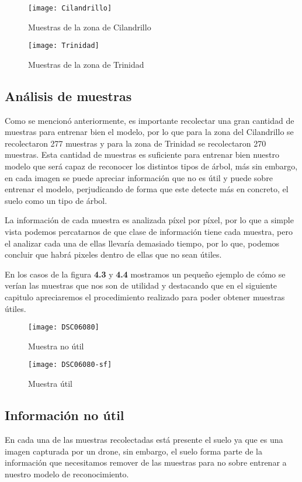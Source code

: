 \begin{figure}
 \centering
\texttt{[image: Cilandrillo]}
\caption{Muestras de la zona de Cilandrillo}
\end{figure}

\begin{figure}
 \centering
\texttt{[image: Trinidad]}
\caption{Muestras de la zona de Trinidad}
\end{figure}

\subsection{Análisis de muestras}
Como se mencionó anteriormente, es importante recolectar una gran cantidad de muestras para entrenar bien el modelo, por lo que para la zona del Cilandrillo se recolectaron 277 muestras y para la zona de Trinidad se recolectaron 270 muestras. Esta cantidad de muestras es suficiente para entrenar bien nuestro modelo que será capaz de reconocer los distintos tipos de árbol, más sin embargo, en cada imagen se puede apreciar información que no es útil y puede sobre entrenar el modelo, perjudicando de forma que este detecte más en concreto, el suelo como un tipo de árbol.

La información de cada muestra es analizada píxel por píxel, por lo que a simple vista podemos percatarnos de que clase de información tiene cada muestra, pero el analizar cada una de ellas llevaría demasiado tiempo, por lo que, podemos concluir que habrá pixeles dentro de ellas que no sean útiles. 

En los casos de la figura \textbf{4.3} y \textbf{4.4} mostramos un pequeño ejemplo de cómo se verían las muestras que nos son de utilidad y destacando que en el siguiente capitulo apreciaremos el procedimiento realizado para poder obtener muestras útiles.

\begin{figure}[b]
  \centering
  \begin{minipage}[b]{0.4\textwidth}
    \texttt{[image: DSC06080]}
    \caption{Muestra no útil}
  \end{minipage}
  \hfill
  \begin{minipage}[b]{0.4\textwidth}
    \texttt{[image: DSC06080-sf]}
    \caption{Muestra útil}
  \end{minipage}
\end{figure}

\newpage

\subsection{Información no útil}
En cada una de las muestras recolectadas está presente el suelo ya que es una imagen capturada por un drone, sin embargo, el suelo forma parte de la información que necesitamos remover de las muestras para no sobre entrenar a nuestro modelo de reconocimiento.

